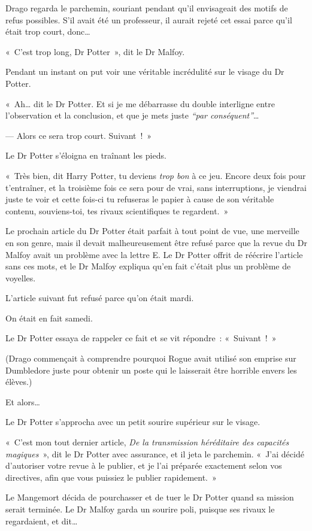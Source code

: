 Drago regarda le parchemin, souriant pendant qu'il envisageait des motifs de refus possibles.
S'il avait été un professeur, il aurait rejeté cet essai parce qu'il était trop court, donc…

«~C'est trop long, Dr Potter~», dit le Dr Malfoy.

Pendant un instant on put voir une véritable incrédulité sur le visage du Dr Potter.

«~Ah… dit le Dr Potter.
Et si je me débarrasse du double interligne entre l'observation et la conclusion, et que je mets juste \emph{“par conséquent”}…

--- Alors ce sera trop court.
Suivant~!~»

Le Dr Potter s'éloigna en traînant les pieds.

«~Très bien, dit Harry Potter, tu deviens \emph{trop bon} à ce jeu.
Encore deux fois pour t'entraîner, et la troisième fois ce sera pour de vrai, sans interruptions, je viendrai juste te voir et cette fois-ci tu refuseras le papier à cause de son véritable contenu, souviens-toi, tes rivaux scientifiques te regardent.~»

Le prochain article du Dr Potter était parfait à tout point de vue, une merveille en son genre, mais il devait malheureusement être refusé parce que la revue du Dr Malfoy avait un problème avec la lettre E\@.
Le Dr Potter offrit de réécrire l'article sans ces mots, et le Dr Malfoy expliqua qu'en fait c'était plus un problème de voyelles.

L'article suivant fut refusé parce qu'on était mardi.

On était en fait samedi.

Le Dr Potter essaya de rappeler ce fait et se vit répondre~: «~Suivant~!~»

(Drago commençait à comprendre pourquoi Rogue avait utilisé son emprise sur Dumbledore juste pour obtenir un poste qui le laisserait être horrible envers les élèves.)

Et alors…

Le Dr Potter s'approcha avec un petit sourire supérieur sur le visage.

«~C'est mon tout dernier article, \emph{De la transmission héréditaire des capacités magiques}~», dit le Dr Potter avec assurance, et il jeta le parchemin.
«~J'ai décidé d'autoriser votre revue à le publier, et je l'ai préparée exactement selon vos directives, afin que vous puissiez le publier rapidement.~»

Le Mangemort décida de pourchasser et de tuer le Dr Potter quand sa mission serait terminée.
Le Dr Malfoy garda un sourire poli, puisque ses rivaux le regardaient, et dit…

